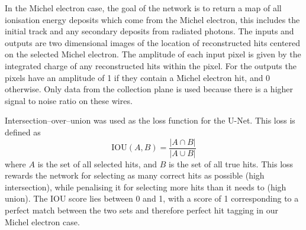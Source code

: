 In the Michel electron case, the goal of the network is to return a map of all
ionisation energy deposits which come from the Michel electron, this includes
the initial track and any secondary deposits from radiated photons. The inputs
and outputs are two dimensional images of the location of reconstructed hits
centered on the selected Michel electron. The amplitude of each input pixel is 
given by the integrated charge of any reconstructed hits within the pixel. For
the outputs the pixels have an amplitude of 1 if they contain a Michel electron
hit, and 0 otherwise. Only data from the collection plane is used because there 
is a higher signal to noise ratio on these wires. 

Intersection--over--union was used as the loss function for the U-Net. This loss
is defined as 
\begin{equation}
	\mbox{IOU}(A, B) = \frac{|A \cap B|}{|A \cup B|}
\end{equation}
where $A$ is the set of all selected hits, and $B$ is the set of all true 
hits\cite{rezatofighi2019generalized}. This loss rewards the network for 
selecting as many correct hits as possible (high intersection), while 
penalising it for selecting more hits than it needs to (high union). The IOU 
score lies between 0 and 1, with a score of 1 corresponding to a perfect match 
between the two sets and therefore perfect hit tagging in our Michel electron 
case.

